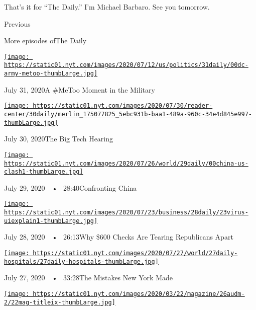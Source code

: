 That's it for ``The Daily.'' I'm Michael Barbaro. See you tomorrow.

Previous

More episodes ofThe Daily

\href{https://www.nytimes.com/2020/07/31/podcasts/the-daily/vanessa-guillen-military-metoo.html?action=click\&module=audio-series-bar\&region=header\&pgtype=Article}{\texttt{[image: https://static01.nyt.com/images/2020/07/12/us/politics/31daily/00dc-army-metoo-thumbLarge.jpg]}}

July 31, 2020A \#MeToo Moment in the Military

\href{https://www.nytimes.com/2020/07/30/podcasts/the-daily/congress-facebook-amazon-google-apple.html?action=click\&module=audio-series-bar\&region=header\&pgtype=Article}{\texttt{[image: https://static01.nyt.com/images/2020/07/30/reader-center/30daily/merlin\_175077825\_5ebc931b-baa1-489a-960c-34e4d845e997-thumbLarge.jpg]}}

July 30, 2020The Big Tech Hearing

\href{https://www.nytimes.com/2020/07/29/podcasts/the-daily/china-trump-foreign-policy.html?action=click\&module=audio-series-bar\&region=header\&pgtype=Article}{\texttt{[image: https://static01.nyt.com/images/2020/07/26/world/29daily/00china-us-clash1-thumbLarge.jpg]}}

July 29, 2020~~•~ 28:40Confronting China

\href{https://www.nytimes.com/2020/07/28/podcasts/the-daily/unemployment-benefits-coronavirus.html?action=click\&module=audio-series-bar\&region=header\&pgtype=Article}{\texttt{[image: https://static01.nyt.com/images/2020/07/23/business/28daily/23virus-uiexplain1-thumbLarge.jpg]}}

July 28, 2020~~•~ 26:13Why \$600 Checks Are Tearing Republicans Apart

\href{https://www.nytimes.com/2020/07/27/podcasts/the-daily/new-york-hospitals-covid.html?action=click\&module=audio-series-bar\&region=header\&pgtype=Article}{\texttt{[image: https://static01.nyt.com/images/2020/07/27/world/27daily-hospitals/27daily-hospitals-thumbLarge.jpg]}}

July 27, 2020~~•~ 33:28The Mistakes New York Made

\href{https://www.nytimes.com/2020/07/26/podcasts/the-daily/the-accusation-the-sunday-read.html?action=click\&module=audio-series-bar\&region=header\&pgtype=Article}{\texttt{[image: https://static01.nyt.com/images/2020/03/22/magazine/26audm-2/22mag-titleix-thumbLarge.jpg]}}

